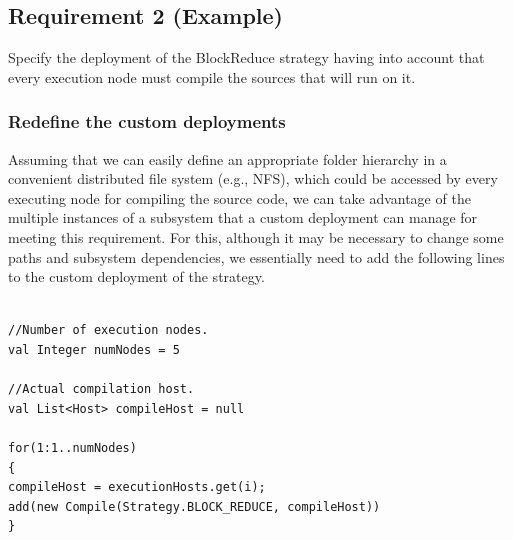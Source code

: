 \documentclass{article}
\begin{document}
 
\subsection{Requirement 2 (Example)}

Specify the deployment of the BlockReduce strategy having into account that every execution node must compile the sources that will run on it. \\

\subsubsection{Redefine the custom deployments}

Assuming that we can easily define an appropriate folder hierarchy in a convenient distributed file system (e.g., NFS), which could be accessed by every executing node for compiling the source code, we can take advantage of the multiple instances of a subsystem that a custom deployment can manage for meeting this requirement. For this, although it may be necessary to change some paths and subsystem dependencies, we essentially need to add the following lines to the custom deployment of the strategy. \\

\begin{lstlisting}[style=amelia,caption=Redefining custom deployments.]

//Number of execution nodes.
val Integer numNodes = 5

//Actual compilation host.
val List<Host> compileHost = null

for(1:1..numNodes)
{
compileHost = executionHosts.get(i);
add(new Compile(Strategy.BLOCK_REDUCE, compileHost))
}
\end{lstlisting}



\end{document}
